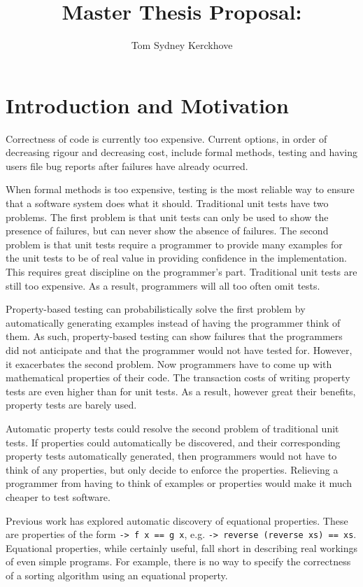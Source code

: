 \documentclass[a4paper, 11pt]{article}
\title{Master Thesis Proposal:\\\vspace{0.5cm}{\Huge Functional Property Discovery and Corresponding Test Generation in Haskell}}
\author{Tom Sydney Kerckhove}
\begin{document}
\maketitle

\section{Introduction and Motivation}

Correctness of code is currently too expensive.
Current options, in order of decreasing rigour and decreasing cost, include formal methods, testing and having users file bug reports after failures have already ocurred.

When formal methods is too expensive, testing is the most reliable way to ensure that a software system does what it should.
Traditional unit tests have two problems.
The first problem is that unit tests can only be used to show the presence of failures, but can never show the absence of failures.
The second problem is that unit tests require a programmer to provide many examples for the unit tests to be of real value in providing confidence in the implementation.
This requires great discipline on the programmer's part.
Traditional unit tests are still too expensive.
As a result, programmers will all too often omit tests.

Property-based testing \cite{QuickCheck} can probabilistically solve the first problem by automatically generating examples instead of having the programmer think of them.
As such, property-based testing can show failures that the programmers did not anticipate and that the programmer would not have tested for.
However, it exacerbates the second problem.
Now programmers have to come up with mathematical properties of their code.
The transaction costs of writing property tests are even higher than for unit tests.
As a result, however great their benefits, property tests are barely used.

Automatic property tests could resolve the second problem of traditional unit tests.
If properties could automatically be discovered, and their corresponding property tests automatically generated, then programmers would not have to think of any properties, but only decide to enforce the properties.
Relieving a programmer from having to think of examples or properties would make it much cheaper to test software.

Previous work \cite{QuickSpec} has explored automatic discovery of equational properties.
These are properties of the form \texttt{\x -> f x == g x}, e.g. \texttt{\xs -> reverse (reverse xs) == xs}.
Equational properties, while certainly useful, fall short in describing real workings of even simple programs.
For example, there is no way to specify the correctness of a sorting algorithm using an equational property.
\end{document}
